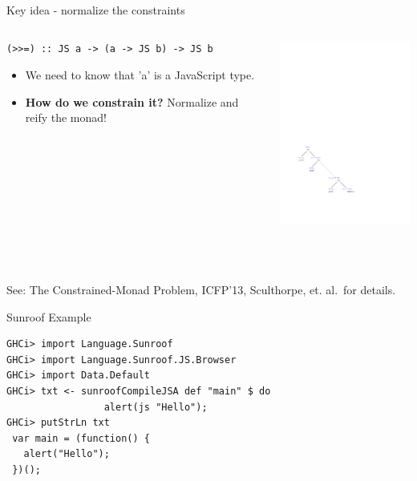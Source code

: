 \documentclass{beamer}
\begin{document}
\begin{frame}[fragile]{Key idea - normalize the constraints}

\begin{columns}
\begin{column}{0.45\textwidth}

\begin{codeblock}[0.8]
\tiny
\begin{verbatim}
(>>=) :: JS a -> (a -> JS b) -> JS b
\end{verbatim}
\end{codeblock}


\begin{itemize}
\item We need to know that 'a' is a JavaScript type.
\item {\bf How do we constrain it?} Normalize and reify the monad!
\end{itemize}

\end{column}

\begin{column}{0.55\textwidth}

\includegraphics[width=150pt]{MonadNormalForm.pdf}

\end{column}
\end{columns}

~\\
~\\
See: The Constrained-Monad Problem, ICFP'13, Sculthorpe, et. al.\ for details.


\end{frame}

\begin{frame}[fragile]{Sunroof Example}
        
        
\begin{codeblock}[0.8]
\begin{verbatim}
GHCi> import Language.Sunroof
GHCi> import Language.Sunroof.JS.Browser
GHCi> import Data.Default
GHCi> txt <- sunroofCompileJSA def "main" $ do 
                 alert(js "Hello");
GHCi> putStrLn txt
 var main = (function() {
   alert("Hello");
 })();
\end{verbatim}
\end{codeblock}

\end{frame}
\end{document}
